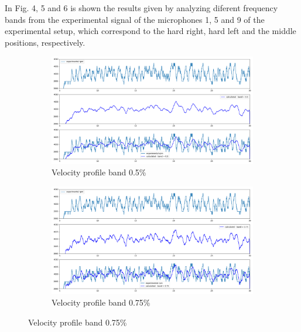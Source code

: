 \documentclass[10pt,fleqn,a4paper,twoside]{article}
\begin{document}
In Fig. 4, 5 and 6 is shown the results given by analyzing diferent frequency bands from the experimental signal of the microphones 1, 5 and 9 of the experimental setup, which correspond to the hard right, hard left and the middle positions, respectively. 
\newpage
\begin{figure}[H] 
    \centering
    \begin{subfigure}{0.4\textwidth}
        \includegraphics[width=\textwidth]{Figures/rpm_analysis_mic0_band_0.5.png}
        \caption{Velocity profile band 0.5\%}
        \label{fig:second}
    \end{subfigure}
    \hfill
    \centering
    \begin{subfigure}{0.4\textwidth}
        \includegraphics[width=\textwidth]{Figures/rpm_analysis_mic0_band_0.75.png}
        \caption{Velocity profile band 0.75\%}
        \label{fig:third}
    \end{subfigure}
    \centering
    \hfill
    

\end{figure}
\end{document}
